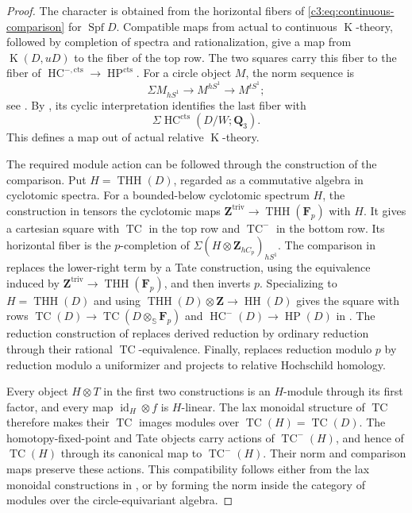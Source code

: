 \documentclass[11pt,a4paper]{amsart}
\numberwithin{equation}{section}
\theoremstyle{definition}
\theoremstyle{remark}
\newcommand{\CthreeZ}{\mathbf{Z}}
\newcommand{\CthreeQ}{\mathbf{Q}}
\newcommand{\CthreeF}{\mathbf{F}}
\newcommand{\CthreebS}{\mathbb{S}}
\newcommand{\Cthreects}{\mathrm{cts}}
\newcommand{\Cthreetriv}{\mathrm{triv}}
\DeclareMathOperator{\CthreeK}{K}
\DeclareMathOperator{\CthreeHH}{HH}
\DeclareMathOperator{\CthreeHC}{HC}
\DeclareMathOperator{\CthreeHP}{HP}
\DeclareMathOperator{\CthreeTHH}{THH}
\DeclareMathOperator{\CthreeTC}{TC}
\DeclareMathOperator{\CthreeSpf}{Spf}
\DeclareMathOperator{\Cthreeid}{id}
\begin{document}
\begin{proof}
The character is obtained from the horizontal fibers of
\eqref{c3:eq:continuous-comparison} for $\CthreeSpf D$.
Compatible maps from actual to continuous $\CthreeK$-theory, followed by
completion of spectra and rationalization, give a map from
$\CthreeK(D,uD)$ to the fiber of the top row.
The two squares carry this fiber to the fiber of
$\CthreeHC^{-,\Cthreects}\to\CthreeHP^\Cthreects$.
For a circle object $M$, the norm sequence is
\[
 \Sigma M_{hS^1}\longrightarrow M^{hS^1}
       \longrightarrow M^{tS^1};
\]
see \cite[\S I.3 and Corollary~I.4.3]{NikolausScholze}.
By \cite[Theorem~2.1, Lemma~2.2, and Theorem~2.3]{HoyoisCircle},
its cyclic interpretation identifies the last fiber with
\[\Sigma\CthreeHC^\Cthreects(D/W;\CthreeQ_3).\]
This defines a map out of actual relative $\CthreeK$-theory.

The required module action can be followed through the construction of
the comparison. Put $H=\CthreeTHH(D)$, regarded as a commutative algebra in
cyclotomic spectra.
For a bounded-below cyclotomic spectrum $H$, the construction in
\cite[Proposition~2.8]{AMMN} tensors the cyclotomic maps
$\CthreeZ^{\Cthreetriv}\to\CthreeTHH(\CthreeF_p)$ with $H$.
It gives a cartesian square with $\CthreeTC$ in the top row and $\CthreeTC^-$ in
the bottom row.
Its horizontal fiber is the $p$-completion of
$\Sigma(H\otimes\CthreeZ_{hC_p})_{hS^1}$.
The comparison in \cite[Corollary~2.10]{AMMN} replaces the lower-right
term by a Tate construction, using the equivalence induced by
$\CthreeZ^{\Cthreetriv}\to\CthreeTHH(\CthreeF_p)$, and then inverts $p$.
Specializing to $H=\CthreeTHH(D)$ and using
$\CthreeTHH(D)\otimes\CthreeZ\to\CthreeHH(D)$ gives the square with rows
$\CthreeTC(D)\to\CthreeTC(D\otimes_{\CthreebS}\CthreeF_p)$ and
$\CthreeHC^-(D)\to\CthreeHP(D)$ in \cite[Theorem~2.12]{AMMN}.
The reduction construction of \cite[Definition~2.14]{AMMN} replaces
derived reduction by ordinary reduction through their rational
$\CthreeTC$-equivalence.
Finally, \cite[Proposition~4.10]{AMMN} replaces reduction modulo $p$
by reduction modulo a uniformizer and projects to relative
Hochschild homology.

Every object $H\otimes T$ in the first two constructions is an
$H$-module through its first factor, and every map
$\Cthreeid_H\otimes f$ is $H$-linear.
The lax monoidal structure of $\CthreeTC$ therefore makes their $\CthreeTC$ images
modules over $\CthreeTC(H)=\CthreeTC(D)$.
The homotopy-fixed-point and Tate objects carry actions of $\CthreeTC^-(H)$,
and hence of $\CthreeTC(H)$ through its canonical map to $\CthreeTC^-(H)$.
Their norm and comparison maps preserve these actions.
This compatibility follows either from the lax monoidal constructions
in \cite[\S I.3 and Corollary~I.4.3]{NikolausScholze}, or by forming the norm
inside the category of modules over the circle-equivariant algebra.


\end{proof}
\end{document}
